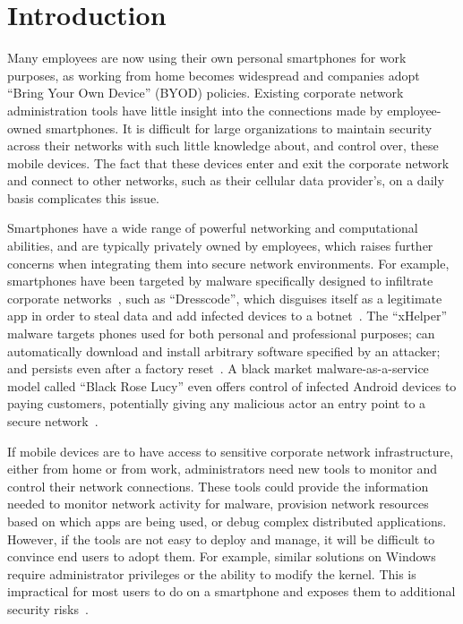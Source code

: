 \section{Introduction}
\label{sec:introduction}


Many employees are now using their own personal smartphones for work purposes,
as working from home becomes widespread and companies adopt ``Bring Your Own
Device'' (BYOD) policies. Existing corporate network administration tools have
little insight into the connections made by employee-owned smartphones. It is
difficult for large organizations to maintain security across their networks
with such little knowledge about, and control over, these mobile devices. The
fact that these devices enter and exit the corporate network and connect to
other networks, such as their cellular data provider's, on a daily basis
complicates this issue.

Smartphones have a wide range of powerful networking and computational
abilities, and are typically privately owned by employees, which raises further
concerns when integrating them into secure network environments. For example,
smartphones have been targeted by malware specifically designed to infiltrate
corporate networks~\cite{kan2016}, such as ``Dresscode'', which disguises itself
as a legitimate app in order to steal data and add infected devices to a
botnet~\cite{palmer2016}. The ``xHelper'' malware targets phones used for both
personal and professional purposes; can automatically download and install
arbitrary software specified by an attacker; and persists even after a factory
reset~\cite{vijayan2020}. A black market malware-as-a-service model called
``Black Rose Lucy'' even offers control of infected Android devices to paying
customers, potentially giving any malicious actor an entry point to a secure
network~\cite{wong2018}.

If mobile devices are to have access to sensitive corporate network
infrastructure, either from home or from work, administrators need new tools to
monitor and control their network connections. These tools could provide the
information needed to monitor network activity for malware, provision network
resources based on which apps are being used, or debug complex distributed
applications. However, if the tools are not easy to deploy and manage, it will
be difficult to convince end users to adopt them. For example, similar
solutions on Windows~\cite{chuluundorj2019, kwon2011} require administrator
privileges or the ability to modify the kernel. This is impractical for most
users to do on a smartphone and exposes them to additional security
risks~\cite{google2020}.

